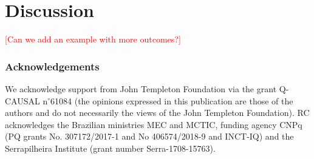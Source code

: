 \documentclass[letterpaper]{article}
\begin{document}
\section*{Discussion}

\textcolor{red}{[Can we add an example with more outcomes?]}


\subsubsection*{Acknowledgements}
We acknowledge support from John Templeton Foundation via the grant Q-CAUSAL n$^{\circ}$61084 (the opinions expressed in this publication are those of the authors and do not necessarily  the views of the John Templeton
Foundation). RC acknowledges the Brazilian ministries MEC and MCTIC, funding agency CNPq (PQ grants No. 307172/2017-1 and No 406574/2018-9 and INCT-IQ) and the Serrapilheira Institute (grant number Serra-1708-15763).
\end{document}
